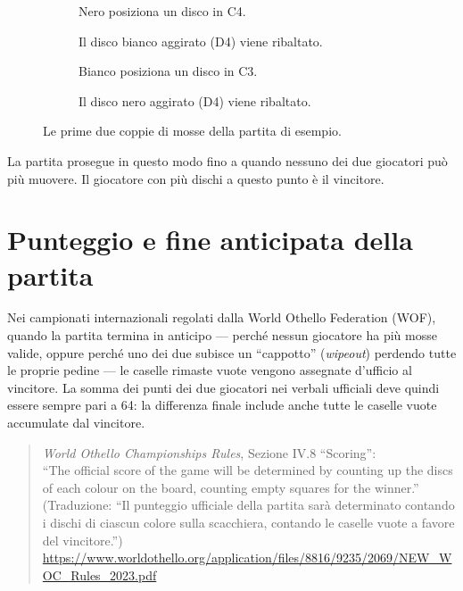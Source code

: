 \begin{figure}[htbp]
  \centering
  \begin{subfigure}[b]{0.45\textwidth}
    \centering
    \caption{Nero posiziona un disco in C4.}
  \end{subfigure}
  \hfill
  \begin{subfigure}[b]{0.45\textwidth}
    \centering
    \caption{Il disco bianco aggirato (D4) viene ribaltato.}
  \end{subfigure}

  \begin{subfigure}[b]{0.45\textwidth}
    \centering
    \caption{Bianco posiziona un disco in C3.}
  \end{subfigure}
  \hfill
  \begin{subfigure}[b]{0.45\textwidth}
    \centering
    \caption{Il disco nero aggirato (D4) viene ribaltato.}
  \end{subfigure}
  \caption{Le prime due coppie di mosse della partita di esempio.}
  \label{fig:rules-sg}
\end{figure}

La partita prosegue in questo modo fino a quando nessuno dei due giocatori può
più muovere. Il giocatore con più dischi a questo punto è il vincitore.

\section{Punteggio e fine anticipata della partita}

Nei campionati internazionali regolati dalla World Othello Federation (WOF),
quando la partita termina in anticipo — perché nessun giocatore ha più mosse
valide, oppure perché uno dei due subisce un ``cappotto'' (\emph{wipeout})
perdendo tutte le proprie pedine — le caselle rimaste vuote vengono assegnate
d'ufficio al vincitore. La somma dei punti dei due giocatori nei verbali
ufficiali deve quindi essere sempre pari a 64: la differenza finale include
anche tutte le caselle vuote accumulate dal vincitore.

\begin{quote}\small
\emph{World Othello Championships Rules}, Sezione IV.8 ``Scoring'':\\
``The official score of the game will be determined by counting up the discs
of each colour on the board, counting empty squares for the winner.''\\
(Traduzione: ``Il punteggio ufficiale della partita sarà determinato contando
i dischi di ciascun colore sulla scacchiera, contando le caselle vuote a
favore del vincitore.'')\\
\url{https://www.worldothello.org/application/files/8816/9235/2069/NEW_WOC_Rules_2023.pdf}
\end{quote}
